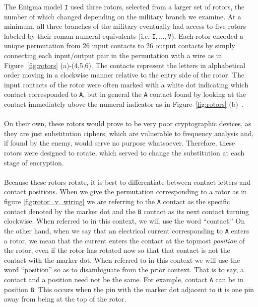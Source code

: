 The Enigma model \texttt{I} used three rotors, selected from a larger
set of rotors, the number of which changed depending on the military
branch we examine. At a minimum, all three branches of the military eventually
had access to five rotors labeled by their roman numeral equivalents
(i.e. $\texttt{I},\dots,\texttt{V}$).
Each rotor encoded a unique permutation from 26 input contacts to 26
output contacts by simply connecting each input/output pair
in the permutation with a wire as in Figure~\ref{fig:rotors}
(a)-(4,5,6). The contacts represent the letters
in alphabetical order moving in a clockwise manner relative to the
entry side of the rotor. The input contacts of the rotor were often marked
with a white dot indicating which contact corresponded to \texttt{A},
but in general the \texttt{A} contact found by looking at the contact immediately above
the numeral indicator as in Figure~\ref{fig:rotors} (b)~\cite{cryptomuseumEnigmaWiring}.
\\\\On their own, these rotors would prove to be very poor
cryptographic devices, as they are just substitution ciphers, which are
vulnerable to frequency analysis and, if found by the enemy, would
serve no purpose whatsoever. Therefore, these rotors were designed to
rotate, which served to change the substitution at each stage of encryption.
\\\\Because these rotors rotate, it is best to differentiate between
contact letters and contact positions. When we give the permutation
corresponding to a rotor as in figure \ref{fig:rotor_v_wiring} we are
referring to the \texttt{A} contact as the specific contact denoted
by the marker dot and the \texttt{B} contact as its next contact
turning clockwise. When referred to in this context, we will use the
word ``contact.'' On the other hand, when we say that an electrical
current corresponding to \texttt{A} enters a rotor, we mean
that the current enters the contact at the topmost \emph{position} of
the rotor, even if the rotor has rotated now so that that contact
is not the contact with the marker dot. When referred to in this
context we will use the word ``position'' so as to disambiguate from
the prior context. That is to say, a contact and a position need not
be the same. For example, contact \texttt{A} can be in position
\texttt{B}. This occurs when the pin with the marker dot adjacent to
it is one pin away from being at the top of the rotor.

